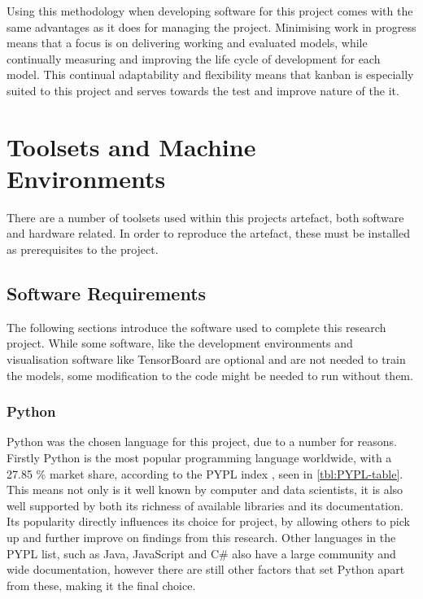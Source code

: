Using this methodology when developing software for this project comes with the same advantages as it does for managing the project. Minimising work in progress means that a focus is on delivering working and evaluated models, while continually measuring and improving the life cycle of development for each model. This continual adaptability and flexibility means that kanban is especially suited to this project and serves towards the test and improve nature of the it.

\section{Toolsets and Machine Environments}
There are a number of toolsets used within this projects artefact, both software and hardware related. In order to reproduce the artefact, these must be installed as prerequisites to the project.

\subsection{Software Requirements}
The following sections introduce the software used to complete this research project. While some software, like the development environments and visualisation software like TensorBoard are optional and are not needed to train the models, some modification to the code might be needed to run without them.


\subsubsection{Python}
Python was the chosen language for this project, due to a number for reasons. Firstly Python is the most popular programming language worldwide, with a 27.85 \% market share, according to the PYPL index \citep{PYPLPopu3:online}, seen in \autoref{tbl:PYPL-table}. This means not only is it well known by computer and data scientists, it is also well supported by both its richness of available libraries and its documentation. Its popularity directly influences its choice for project, by allowing others to pick up and further improve on findings from this research. Other languages in the PYPL list, such as Java, JavaScript and C\# also have a large community and wide documentation, however there are still other factors that set Python apart from these, making it the final choice. 

